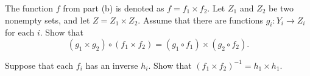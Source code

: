 \item The function $f$ from part (b) is denoted as $f = f_1 \times f_2$. Let $Z_1$ and $Z_2$ be two nonempty sets, and let $Z = Z_1 \times Z_2$. Assume that there are functions $g_i : Y_i \to Z_i$ for each $i$. Show that 
\[\left(g_1 \times g_2\right) \circ \left(f_1 \times f_2\right) = (g_1 \circ f_1) \times (g_2 \circ f_2).\]

\item Suppose that each $f_i$ has an inverse $h_i$. Show that $\left(f_1 \times f_2\right)^{-1} = h_1 \times h_1$. 

\ea

\begin{comment}

\ExerciseSolution
\ba
\item Let $t_1 \in X_1$ and $t_2 \in X_2$. Then $\pi_1((t_1,t_2)) = t_1$ and $\pi_2((t_1,t_2)) = t_2$. So each $\pi_i$ is a surjection. 

\item Let $x = (x_j)$ be in $X$. Since $f_i$ maps $X_i$ to $Y_i$, we know that $f_i(x_i) \in Y_i$.  Define $f: X \to Y$ by $f(x) = (f_i(x_i))$. Then
\[(\pi_i \circ f)(x) = \pi_i(f(x)) = \pi_i((f_j(x_j))) = f_i(x_i) \text{ and } (f_i \circ \pi_i)(x) = f_i(\pi_i(x)) = f_i(x_i),\]
so $\pi_i \circ f = f_i \circ \pi_i$.

To prove uniqueness, suppose there is another function $F : X \to Y$ with $\pi_i \circ F = f_i \circ \pi_i$ for each $i$.  Let $t = (t_1, t_2) \in X$ and let $F(t) = F((t_1,t_2)) = (s_1,s_2)$ in $Y$. Then 
\[(\pi_i \circ F)(t) = \pi_i(F(t)) = \pi_i(s_1,s_2) = s_i\]
and
\[(f_i \circ \pi_i)(t) = f_i(\pi_i(t)) = f_i (t_i).\]
So $s_i = f_i(t_i)$ for each $i$ and $F(t) = (s_1,s_2) = (f_1(t_1), f_2(t_2)) = f(t)$. Therefore $F = f$ and the function $f$ is unique.

\item Let $x = (x_1,x_2)$ be in $X$. Then
\begin{align*}
\left[\left(g_1 \times g_2\right) \circ \left(f_1 \times f_2\right)]\right](x) &= \left(g_1 \times g_2\right)\left( \left(f_1 \times f_2\right)(x)\right) \\
	&= \left(g_1 \times g_2\right)((f_1(x_1), f_2(x_2))) \\
	&= (g_1(f_1(x_1)), g_2(f_2(x_2))) \\
	&= ((g_1 \circ f_1)(x_1), (g_2 \circ f_2)(x_2)) \\
	&= ((g_1 \circ f_1) \times (g_2 \circ f_2))(x).
\end{align*}
So $\left(g_1 \times g_2\right) \circ \left(f_1 \times f_2\right) = (g_1 \circ f_1) \times (g_2 \circ f_2)$.


\end{comment}
